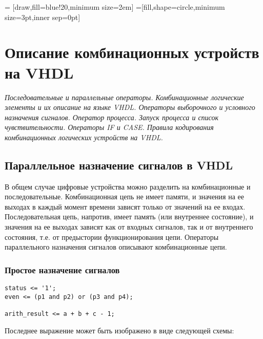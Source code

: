  = [draw,fill=blue!20,minimum size=2em]
=[fill,shape=circle,minimum size=3pt,inner sep=0pt]

\chapter{Описание комбинационных устройств на VHDL}

\emph{Последовательные и параллельные операторы. Комбинационные логические элементы и их описание на языке VHDL. Операторы выборочного и условного назначения сигналов. Оператор процесса. Запуск процесса и список чувствительности. Операторы IF и CASE. Правила кодирования комбинационных логических устройств на VHDL.}

\section{Параллельное назначение сигналов в VHDL}

В общем случае цифровые устройства можно разделить на комбинационные и последовательные. Комбинационная цепь не имеет памяти, и значения на ее выходах в каждый момент времени зависят только от значений на ее входах.  Последовательная цепь, напротив, имеет память (или внутреннее состояние), и значения на ее выходах зависят как от входных сигналов, так и от внутреннего состояния, т.е. от предыстории функционирования цепи. Операторы параллельного назначения сигналов описывают комбинационные цепи.

\subsection{Простое назначение сигналов}
\begin{lstlisting}
status <= '1';
even <= (p1 and p2) or (p3 and p4);

arith_result <= a + b + c - 1;
\end{lstlisting}
Последнее выражение может быть изображено в виде следующей схемы:

